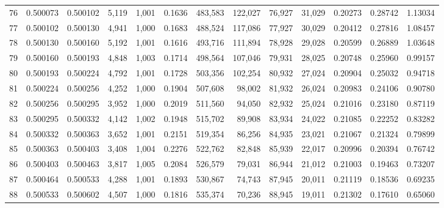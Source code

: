 \begin{tabular}{rrrrrrrrrrrrr}
76  &  0.500073 &  0.500102 &  5,119 &  1,001 &                                     0.1636 &  483,583 &  122,027 &   76,927 &   31,029 &  0.20273 &  0.28742 &  1.13034 \\
77  &  0.500102 &  0.500130 &  4,941 &  1,000 &                                     0.1683 &  488,524 &  117,086 &   77,927 &   30,029 &  0.20412 &  0.27816 &  1.08457 \\
78  &  0.500130 &  0.500160 &  5,192 &  1,001 &                                     0.1616 &  493,716 &  111,894 &   78,928 &   29,028 &  0.20599 &  0.26889 &  1.03648 \\
79  &  0.500160 &  0.500193 &  4,848 &  1,003 &                                     0.1714 &  498,564 &  107,046 &   79,931 &   28,025 &  0.20748 &  0.25960 &  0.99157 \\
80  &  0.500193 &  0.500224 &  4,792 &  1,001 &                                     0.1728 &  503,356 &  102,254 &   80,932 &   27,024 &  0.20904 &  0.25032 &  0.94718 \\
81  &  0.500224 &  0.500256 &  4,252 &  1,000 &                                     0.1904 &  507,608 &   98,002 &   81,932 &   26,024 &  0.20983 &  0.24106 &  0.90780 \\
82  &  0.500256 &  0.500295 &  3,952 &  1,000 &                                     0.2019 &  511,560 &   94,050 &   82,932 &   25,024 &  0.21016 &  0.23180 &  0.87119 \\
83  &  0.500295 &  0.500332 &  4,142 &  1,002 &                                     0.1948 &  515,702 &   89,908 &   83,934 &   24,022 &  0.21085 &  0.22252 &  0.83282 \\
84  &  0.500332 &  0.500363 &  3,652 &  1,001 &                                     0.2151 &  519,354 &   86,256 &   84,935 &   23,021 &  0.21067 &  0.21324 &  0.79899 \\
85  &  0.500363 &  0.500403 &  3,408 &  1,004 &                                     0.2276 &  522,762 &   82,848 &   85,939 &   22,017 &  0.20996 &  0.20394 &  0.76742 \\
86  &  0.500403 &  0.500463 &  3,817 &  1,005 &                                     0.2084 &  526,579 &   79,031 &   86,944 &   21,012 &  0.21003 &  0.19463 &  0.73207 \\
87  &  0.500464 &  0.500533 &  4,288 &  1,001 &                                     0.1893 &  530,867 &   74,743 &   87,945 &   20,011 &  0.21119 &  0.18536 &  0.69235 \\
88  &  0.500533 &  0.500602 &  4,507 &  1,000 &                                     0.1816 &  535,374 &   70,236 &   88,945 &   19,011 &  0.21302 &  0.17610 &  0.65060 \\

\end{tabular}
